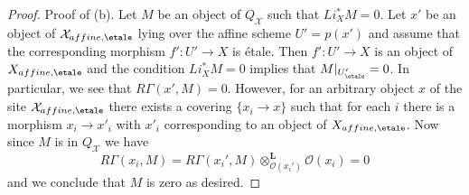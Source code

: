 \begin{proof}
\medskip\noindent
Proof of (b). Let $M$ be an object of $Q_\mathcal{X}$
such that $Li_X^*M = 0$. Let $x'$ be an object of $\mathcal{X}_{affine, \etale}$
lying over the affine scheme $U' = p(x')$ and assume that the corresponding
morphism $f' : U' \to X$ is \'etale. Then $f' : U' \to X$ is an object of
$X_{affine, \etale}$ and the condition $Li_X^*M = 0$ implies that
$M|_{U'_\etale} = 0$. In particular, we see that $R\Gamma(x', M) = 0$.
However, for an arbitrary object $x$ of the site
$\mathcal{X}_{affine, \etale}$ there exists a covering $\{x_i \to x\}$
such that for each $i$ there is a morphism $x_i \to x'_i$ with
$x'_i$ corresponding to an object of $X_{affine, \etale}$.
Now since $M$ is in $Q_\mathcal{X}$ we have
$$
R\Gamma(x_i, M) =
R\Gamma(x_i', M) \otimes_{\mathcal{O}(x_i')}^\mathbf{L} \mathcal{O}(x_i) =
0
$$
and we conclude that $M$ is zero as desired.
\end{proof}
